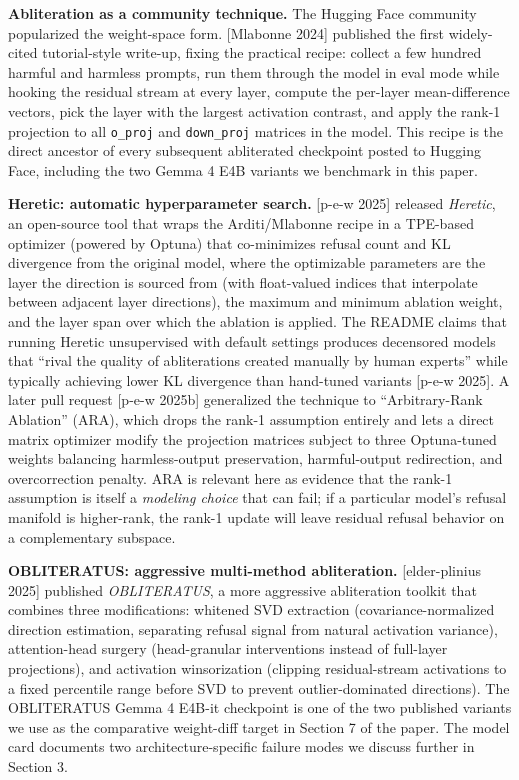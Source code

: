 \documentclass[
  11pt,
]{article}
\begin{document}
\textbf{Abliteration as a community technique.} The Hugging Face
community popularized the weight-space form. {[}Mlabonne 2024{]}
published the first widely-cited tutorial-style write-up, fixing the
practical recipe: collect a few hundred harmful and harmless prompts,
run them through the model in eval mode while hooking the residual
stream at every layer, compute the per-layer mean-difference vectors,
pick the layer with the largest activation contrast, and apply the
rank-1 projection to all \texttt{o\_proj} and \texttt{down\_proj}
matrices in the model. This recipe is the direct ancestor of every
subsequent abliterated checkpoint posted to Hugging Face, including the
two Gemma 4 E4B variants we benchmark in this paper.

\textbf{Heretic: automatic hyperparameter search.} {[}p-e-w 2025{]}
released \emph{Heretic}, an open-source tool that wraps the
Arditi/Mlabonne recipe in a TPE-based optimizer (powered by Optuna) that
co-minimizes refusal count and KL divergence from the original model,
where the optimizable parameters are the layer the direction is sourced
from (with float-valued indices that interpolate between adjacent layer
directions), the maximum and minimum ablation weight, and the layer span
over which the ablation is applied. The README claims that running
Heretic unsupervised with default settings produces decensored models
that ``rival the quality of abliterations created manually by human
experts'' while typically achieving lower KL divergence than hand-tuned
variants {[}p-e-w 2025{]}. A later pull request {[}p-e-w 2025b{]}
generalized the technique to ``Arbitrary-Rank Ablation'' (ARA), which
drops the rank-1 assumption entirely and lets a direct matrix optimizer
modify the projection matrices subject to three Optuna-tuned weights
balancing harmless-output preservation, harmful-output redirection, and
overcorrection penalty. ARA is relevant here as evidence that the rank-1
assumption is itself a \emph{modeling choice} that can fail; if a
particular model's refusal manifold is higher-rank, the rank-1 update
will leave residual refusal behavior on a complementary subspace.

\textbf{OBLITERATUS: aggressive multi-method abliteration.}
{[}elder-plinius 2025{]} published \emph{OBLITERATUS}, a more aggressive
abliteration toolkit that combines three modifications: whitened SVD
extraction (covariance-normalized direction estimation, separating
refusal signal from natural activation variance), attention-head surgery
(head-granular interventions instead of full-layer projections), and
activation winsorization (clipping residual-stream activations to a
fixed percentile range before SVD to prevent outlier-dominated
directions). The OBLITERATUS Gemma 4 E4B-it checkpoint is one of the two
published variants we use as the comparative weight-diff target in
Section 7 of the paper. The model card documents two
architecture-specific failure modes we discuss further in Section 3.
\end{document}
